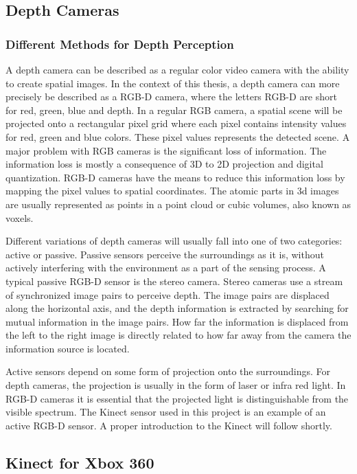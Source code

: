 \subsection{Depth Cameras}

\subsubsection{Different Methods for Depth Perception}

A depth camera can be described as a regular color video camera with the ability to create spatial images. In the context of this thesis, a depth camera can  more precisely be described as a RGB-D camera, where the letters RGB-D are short for red, green, blue and depth. In a regular RGB camera, a spatial scene will be projected onto a rectangular pixel grid where each pixel contains intensity values for red, green and blue colors. These pixel values represents the detected scene. A major problem with RGB cameras is the significant loss of information. The information loss is mostly a consequence of 3D to 2D projection and digital quantization. RGB-D cameras have the means to reduce this information loss by mapping the pixel values to spatial coordinates. The atomic parts in 3d images are usually represented as points in a point cloud or cubic volumes, also known as voxels.

Different variations of depth cameras will usually fall into one of two categories: active or passive. Passive sensors perceive the surroundings as it is, without actively interfering with the environment as a part of the sensing process. A typical passive RGB-D sensor is the stereo camera. Stereo cameras use a stream of synchronized image pairs to perceive depth. The image pairs are displaced along the horizontal axis, and the depth information is extracted by searching for mutual information in the image pairs. How far the information is displaced from the left to the right image is directly related to how far away from the camera the information source is located. 

Active sensors depend on some form of projection onto the surroundings. For depth cameras, the projection is usually in the form of laser or infra red light. In RGB-D cameras it is essential that the projected light is distinguishable from the visible spectrum. The Kinect sensor used in this project is an example of an active RGB-D sensor. A proper introduction to the Kinect will follow shortly.

\subsection{Kinect for Xbox 360}

